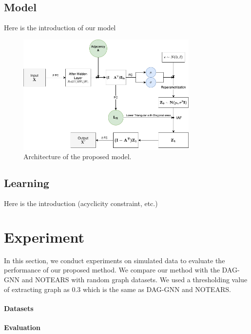 \documentclass[10pt]{article}
\begin{document}
\subsection{Model}

Here is the introduction of our model

\begin{figure}
    \centering
    \includegraphics[width=0.8\textwidth]{fig/model.png}
    \caption{Architecture of the proposed model.}
    \label{diagram}
\end{figure}

\subsection{Learning}

Here is the introduction (acyclicity constraint, etc.)

\section{Experiment}

In this section, we conduct experiments on simulated data to evaluate the performance of our proposed method. We compare our method with the DAG-GNN \cite{yu2019daggnn} and NOTEARS \cite{zheng2018dags} with random graph datasets. We used a thresholding value of extracting graph as 0.3 which is the same as DAG-GNN and NOTEARS.

\paragraph*{Datasets}



\paragraph*{Evaluation}
\end{document}
